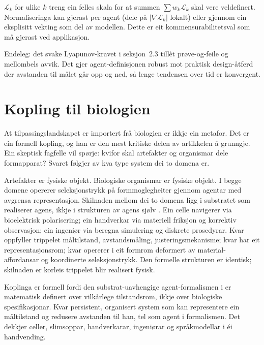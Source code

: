 \documentclass[11pt,a4paper]{article}
\begin{document}
$\mathcal{L}_k$ for ulike $k$ treng ein felles skala for at summen $\sum w_k \mathcal{L}_k$ skal vere veldefinert. Normaliseringa kan gjerast per agent (dele på $|\nabla \mathcal{L}_k|$ lokalt) eller gjennom ein eksplisitt vekting som del av modellen. Dette er eit kommensurabilitetsval som må gjerast ved applikasjon.

Endeleg: det svake Lyapunov-kravet i seksjon~2.3 tillèt prøve-og-feile og mellombels avvik. Det gjer agent-definisjonen robust mot praktisk design-åtferd der avstanden til målet går opp og ned, så lenge tendensen over tid er konvergent.

\section{Kopling til biologien}

At tilpassingslandskapet er importert frå biologien er ikkje ein metafor. Det er ein formell kopling, og han er den mest kritiske delen av artikkelen å grunngje. Ein skeptisk fagfelle vil spørje: kvifor skal artefakter og organismar dele formapparat? Svaret følgjer av kva type system dei to domena er.

Artefakter er fysiske objekt. Biologiske organismar er fysiske objekt. I begge domene opererer seleksjonstrykk på formmoglegheiter gjennom agentar med avgrensa representasjon. Skilnaden mellom dei to domena ligg i substratet som realiserer agens, ikkje i strukturen av agens sjølv \citep{levin2022, fieldslevin2022}. Ein celle navigerer via bioelektrisk polarisering; ein handverkar via materiell friksjon og korrektiv observasjon; ein ingeniør via beregna simulering og diskrete prosedyrar. Kvar oppfyller trippelet måltilstand, avstandsmåling, justeringsmekanisme; kvar har eit representasjonsrom; kvar opererer i eit formrom deformert av material-affordansar og koordinerte seleksjonstrykk. Den formelle strukturen er identisk; skilnaden er korleis trippelet blir realisert fysisk.

Koplinga er formell fordi den substrat-uavhengige agent-formalismen i \citet{fieldslevin2022} er matematisk definert over vilkårlege tilstandsrom, ikkje over biologiske spesifikasjonar. Kvar persistent, organisert system som kan representere ein måltilstand og redusere avstanden til han, tel som agent i formalismen. Det dekkjer celler, slimsoppar, handverkarar, ingeniørar og språkmodellar i éi handvending.
\end{document}
